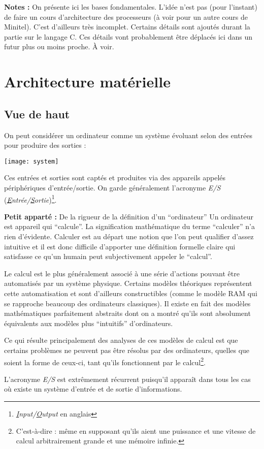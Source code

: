 \documentclass[../../main.tex]{subfiles}
\begin{document}
\textbf{Notes :} On présente ici les bases fondamentales. L'idée n'est pas (pour l'instant) de faire un cours d'architecture des processeurs (à voir pour un autre cours de Minitel). C'est d'ailleurs très incomplet. Certains détails sont ajoutés durant la partie sur le langage C. Ces détails vont probablement être déplacés ici dans un futur plus ou moins proche. À voir.
\section{Architecture matérielle}
\subsection{Vue de haut} \label{sub:vue_de_haut}
On peut considérer un ordinateur comme un système évoluant selon des entrées pour produire des sorties :
\begin{center}
  \texttt{[image: system]}
\end{center}
Ces entrées et sorties sont captés et produites via des appareils appelés périphériques d'entrée/sortie. On garde généralement l'acronyme \textit{E/S} (\textit{\underline{E}ntrée/\underline{S}ortie})\footnote{\textit{\underline{I}nput/\underline{O}utput} en anglais}.

\begin{minitelbasicbox}{\textbf{Petit apparté :} De la rigueur de la définition d'un ``ordinateur''}
Un ordinateur est appareil qui ``calcule''. La signification mathématique du terme ``calculer'' n'a
rien d'évidente. Calculer est au départ une notion que l'on peut qualifier d'assez intuitive et il
est donc difficile d'apporter une définition formelle claire qui satisfasse ce qu'un humain peut
subjectivement appeler le ``calcul''.

Le calcul est le plus généralement associé à une série d'actions pouvant être automatisés par un système physique. Certains modèles théoriques représentent cette automatisation et sont d'ailleurs constructibles (comme le modèle RAM qui se rapproche beaucoup des ordinateurs classiques). Il existe en fait des modèles mathématiques parfaitement abstraits dont on a montré qu'ils sont absolument équivalents aux modèles plus ``intuitifs'' d'ordinateurs.

Ce qui résulte principalement des analyses de ces modèles de calcul est que certains problèmes ne peuvent pas être résolus par des ordinateurs, quelles que soient la forme de ceux-ci, tant qu'ils fonctionnent par le calcul\footnote{C'est-à-dire : même en supposant qu'ils aient une puissance et une vitesse de calcul arbitrairement grande et une mémoire infinie.}.
\end{minitelbasicbox}
L'acronyme \textit{E/S} est extrêmement récurrent puisqu'il apparaît dans tous les cas où existe un système d'entrée et de sortie d'informations.
\end{document}

